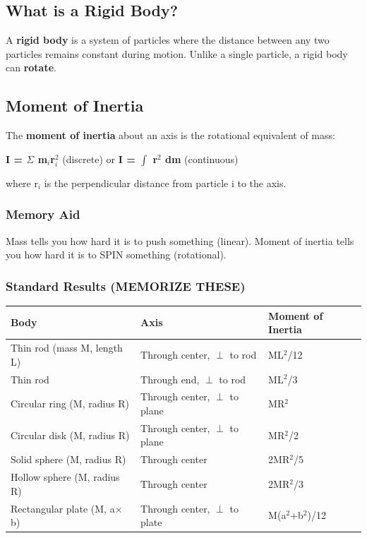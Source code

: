 \documentclass[12pt,a4paper,openany]{book}
\begin{document}
{{\subsection{What is a Rigid Body?}

A \textbf{rigid body} is a system of particles where the distance between any two particles remains constant during motion. Unlike a single particle, a rigid body can \textbf{rotate}.

\subsection{Moment of Inertia}

The \textbf{moment of inertia} about an axis is the rotational equivalent of mass:

\textbf{I = $\Sigma$ m$_i$r$_i^2$} (discrete) or \textbf{I = $\int$ r$^2$ dm} (continuous)

where r$_i$ is the perpendicular distance from particle i to the axis.

\subsubsection{ Memory Aid}
Mass tells you how hard it is to push something (linear). Moment of inertia tells you how hard it is to SPIN something (rotational).

\subsubsection{Standard Results (MEMORIZE THESE)}

\begin{center}
\begin{tabular}{|l|l|l|}
\hline
\textbf{Body} & \textbf{Axis} & \textbf{Moment of Inertia} \\
\hline
Thin rod (mass M, length L) & Through center, $\perp$ to rod & ML$^2$/12 \\
\hline
Thin rod & Through end, $\perp$ to rod & ML$^2$/3 \\
\hline
Circular ring (M, radius R) & Through center, $\perp$ to plane & MR$^2$ \\
\hline
Circular disk (M, radius R) & Through center, $\perp$ to plane & MR$^2$/2 \\
\hline
Solid sphere (M, radius R) & Through center & 2MR$^2$/5 \\
\hline
Hollow sphere (M, radius R) & Through center & 2MR$^2$/3 \\
\hline
Rectangular plate (M, a$\times$b) & Through center, $\perp$ to plate & M(a$^2$+b$^2$)/12 \\
\hline
\end{tabular}
\end{center}

}}
\end{document}
